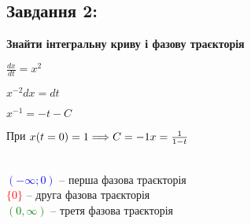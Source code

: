 \subsection{Завдання 2:}

\textbf{Знайти інтегральну криву і фазову траєкторія}

\begin{minipage}{0.49\textwidth}
    $\frac{dx}{dt} = x^2$

    $x^{-2}dx = dt$

    $x^{-1} = -t - C$

    При $x(t = 0) = 1 \Longrightarrow C = -1\\
    x = \frac{1}{1-t}$

\end{minipage}
\begin{minipage}{0.49\textwidth}
    \centering \resizebox*{7cm}{7cm}{}\\
    \textcolor{blue}{$(-\infty;0)$} -- перша фазова траєкторія\\
    \textcolor{red}{$\{0\}$} -- друга фазова траєкторія\\
    \textcolor{green}{$(0, \infty)$} -- третя фазова траєкторія
\end{minipage}

